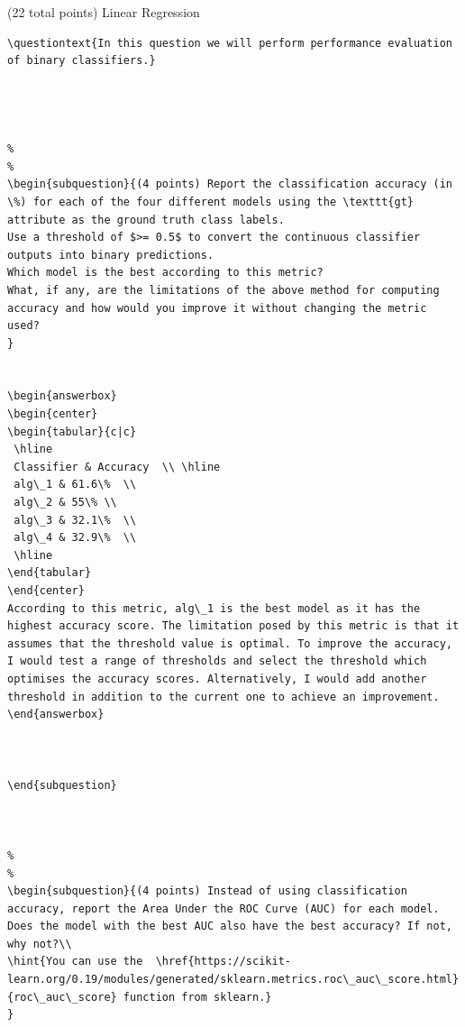 \documentclass[12pt]{article}
\begin{document}
\begin{question}{(22 total points) Linear Regression}
\begin{subquestion}
\begin{answerbox}{20em}
\begin {verbatim}
\questiontext{In this question we will perform performance evaluation of binary classifiers.}




%
%
\begin{subquestion}{(4 points) Report the classification accuracy (in \%) for each of the four different models using the \texttt{gt} attribute as the ground truth class labels. 
Use a threshold of $>= 0.5$ to convert the continuous classifier outputs into binary predictions. 
Which model is the best according to this metric?
What, if any, are the limitations of the above method for computing accuracy and how would you improve it without changing the metric used?
}


\begin{answerbox}{15em}
\begin{center}
\begin{tabular}{c|c}
 \hline
 Classifier & Accuracy  \\ \hline
 alg\_1 & 61.6\%  \\
 alg\_2 & 55\% \\
 alg\_3 & 32.1\%  \\
 alg\_4 & 32.9\%  \\
 \hline
\end{tabular}
\end{center}
According to this metric, alg\_1 is the best model as it has the highest accuracy score. The limitation posed by this metric is that it assumes that the threshold value is optimal. To improve the accuracy, I would test a range of thresholds and select the threshold which optimises the accuracy scores. Alternatively, I would add another threshold in addition to the current one to achieve an improvement.
\end{answerbox}



\end{subquestion}



%
%
\begin{subquestion}{(4 points) Instead of using classification accuracy, report the Area Under the ROC Curve (AUC) for each model. 
Does the model with the best AUC also have the best accuracy? If not, why not?\\
\hint{You can use the  \href{https://scikit-learn.org/0.19/modules/generated/sklearn.metrics.roc\_auc\_score.html}{roc\_auc\_score} function from sklearn.}
}



\end{verbatim}
\end{answerbox}
\end{subquestion}
\end{question}
\end{document}
